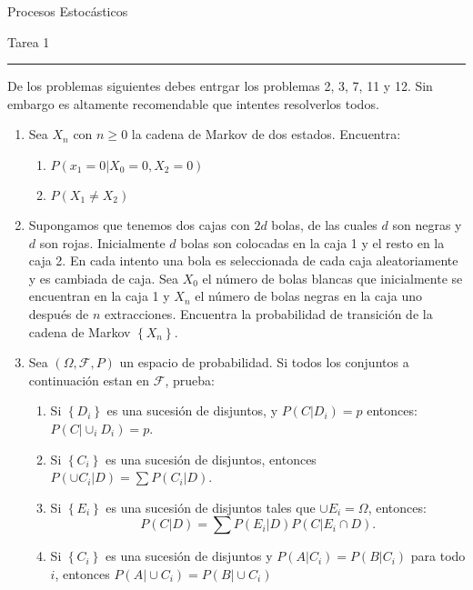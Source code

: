 \documentclass{report}
\begin{document}
\begin{center}
    \textsf{\Large Procesos Estocásticos}
    \par\medskip
    \textsf{\large Tarea 1}
    \end{center}
    \hrule
    \par\bigskip
De los problemas siguientes debes entrgar los problemas 2, 3, 7, 11 y 12. Sin embargo es altamente recomendable que intentes resolverlos todos.
\begin{enumerate}
    \item Sea $X_n$ con $n\geq 0$ la cadena de Markov de dos estados. Encuentra:
    \begin{enumerate}
        \item $P\left(\left. x_1=0\right\vert X_0=0, X_2=0\right)$
        \item $P\left(X_1\neq X_2\right)$
    \end{enumerate}
    \item Supongamos que tenemos dos cajas con $2d$ bolas, de las cuales $d$ son negras y $d$ son rojas. Inicialmente $d$ bolas son colocadas en la caja 1 y el resto en la caja 2. En cada intento una bola es seleccionada de cada caja aleatoriamente y es cambiada de caja. Sea $X_0$ el número de bolas blancas que inicialmente se encuentran en la caja 1 y $X_n$ el número de bolas negras en la caja uno después de $n$ extracciones. Encuentra la probabilidad de transición de la cadena de Markov $\left\{X_n\right\}$.
    \item Sea $\left(\Omega, \mathcal{F}, P\right)$ un espacio de probabilidad. Si todos los conjuntos a continuación estan en $\mathcal{F}$, prueba:
    \begin{enumerate}
        \item Si $\left\{D_i\right\}$ es una sucesión de disjuntos, y $P(\left.C\right\vert D_i)=p$ entonces: $P\left(\left. C \right\vert \cup_i D_i\right)=p$.
        \item Si $\left\{C_i\right\}$ es una sucesión de disjuntos, entonces $P\left(\left.\cup C_i\right\vert D\right)= \sum P\left(\left.C_i\right\vert D\right)$.
        \item Si $\left\{E_i\right\}$ es una sucesión de disjuntos tales que $\cup E_i = \Omega$, entonces:
        $$
        P\left(\left.C\right\vert D \right)= \sum P\left(\left.E_i\right\vert D\right)P\left(\left. C\right\vert E_i\cap D\right).
        $$
        \item Si $\left\{C_i\right\}$ es una sucesión de disjuntos y $P\left(\left. A\right\vert C_i\right) = P\left(\left. B\right\vert C_i\right)$ para todo $i$, entonces $P\left(\left. A\right\vert \cup C_i\right) = P\left(\left. B\right\vert \cup C_i\right)$

\end{enumerate}
\end{enumerate}
\end{document}
